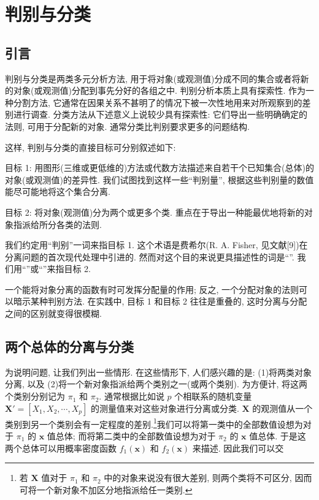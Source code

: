 
\chapter{判别与分类}
\label{chap:11}

\section{引言}  %
\label{sec:11.1}

判别与分类是两类多元分析方法, 用于将对象(或观测值)分成不同的集合或者将新的对象(或观测值)分配到事先分好的各组之中. 判别分析本质上具有探索性. 作为一种分割方法, 它通常在因果关系不甚明了的情况下被一次性地用来对所观察到的差别进行调查. 分类方法从下述意义上说较少具有探索性: 它们导出一些明确确定的法则, 可用于分配新的对象. 通常分类比判别要求更多的问题结构.

这样, 判别与分类的直接目标可分别叙述如下:

目标 1: 用图形(三维或更低维的)方法或代数方法描述来自若干个已知集合(总体)的对象(或观测值)的差异性. 我们试图找到这样一些“判别量”, 根据这些判别量的数值能尽可能地将这个集合分离.

目标 2: 将对象(观测值)分为两个或更多个类. 重点在于导出一种能最优地将新的对象指派给所分各类的法则.

我们约定用“判别”一词来指目标 1. 这个术语是费希尔(R. A. Fisher, 见文献[9])在分离问题的首次现代处理中引进的. 然而对这个目的来说更具描述性的词是“”. 我们用“”或“”来指目标 2.

一个能将对象分离的函数有时可发挥分配量的作用; 反之, 一个分配对象的法则可以暗示某种判别方法. 在实践中, 目标 1 和目标 2 往往是重叠的, 这时分离与分配之间的区别就变得很模糊.

\section{两个总体的分离与分类}  %
\label{sec:11.2}

为说明问题, 让我们列出一些情形. 在这些情形下, 人们感兴趣的是: (1)将两类对象分离, 以及 (2)将一个新对象指派给两个类别之一(或两个类别). 为方便计, 将这两个类别分别记为 $\pi_1$ 和 $\pi_2$. 通常根据比如说 $p$ 个相联系的随机变量 $\mathbf{X}'=[X_1,X_2,\cdots,X_p]$ 的测量值来对这些对象进行分离或分类. $\mathbf{X}$ 的观测值从一个类别到另一个类别会有一定程度的差别.\footnote{若 $\mathbf{X}$ 值对于 $\pi_1$ 和 $\pi_2$ 中的对象来说没有很大差别, 则两个类将不可区分, 因而可将一个新对象不加区分地指派给任一类别.}我们可以将第一类中的全部数值设想为对于 $\pi_1$ 的 $\mathbf{x}$ 值总体; 而将第二类中的全部数值设想为对于 $\pi_2$ 的 $\mathbf{x}$ 值总体. 于是这两个总体可以用概率密度函数 $f_1(\mathbf{x})$ 和 $f_2(\mathbf{x})$ 来描述. 因此我们可以交
